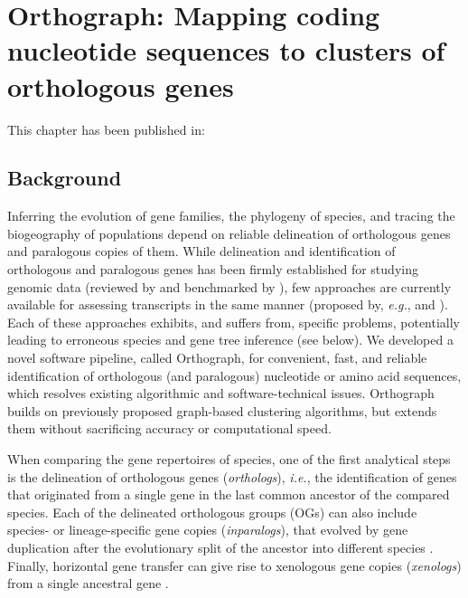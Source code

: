 \chapter{Orthograph: Mapping coding nucleotide sequences to clusters of
orthologous genes}
\label{cha:orthograph}


\newpage

This chapter has been published in: 

\section{Background}\label{background}

Inferring the evolution of gene families, the phylogeny of species, and
tracing the biogeography of populations depend on reliable delineation
of orthologous genes and paralogous copies of them. While delineation
and identification of orthologous and paralogous genes has been firmly
established for studying genomic data (reviewed by \cite{Kristensen2011}
and benchmarked by \cite{Trachana2011}), few approaches are currently
available for assessing transcripts in the same manner (proposed by,
\emph{e.g.}, \cite{Ebersberger2009} and \cite{Schreiber2009}). Each of
these approaches exhibits, and suffers from, specific problems,
potentially leading to erroneous species and gene tree inference (see
below). We developed a novel software pipeline, called Orthograph, for
convenient, fast, and reliable identification of orthologous (and
paralogous) nucleotide or amino acid sequences, which resolves existing
algorithmic and software-technical issues. Orthograph builds on
previously proposed graph-based clustering algorithms, but extends them
without sacrificing accuracy or computational speed.

When comparing the gene repertoires of species, one of the first
analytical steps is the delineation of orthologous genes
(\emph{orthologs}), \emph{i.e.}, the identification of genes that
originated from a single gene in the last common ancestor of the
compared species. Each of the delineated orthologous groups (OGs) can
also include species- or lineage-specific gene copies
(\emph{inparalogs}), that evolved by gene duplication after the
evolutionary split of the ancestor into different species
\cite{Koonin2005}. Finally, horizontal gene transfer can give rise to
xenologous gene copies (\emph{xenologs}) from a single ancestral gene
\cite{Koonin2005}.

